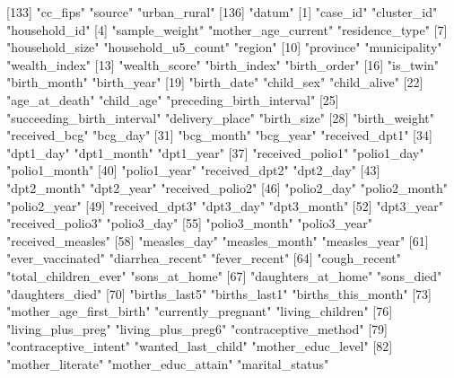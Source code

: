 [133] "cc_fips"                   "source"                    "urban_rural"              
[136] "datum"                    
  [1] "case_id"                   "cluster_id"                "household_id"             
  [4] "sample_weight"             "mother_age_current"        "residence_type"           
  [7] "household_size"            "household_u5_count"        "region"                   
 [10] "province"                  "municipality"              "wealth_index"             
 [13] "wealth_score"              "birth_index"               "birth_order"              
 [16] "is_twin"                   "birth_month"               "birth_year"               
 [19] "birth_date"                "child_sex"                 "child_alive"              
 [22] "age_at_death"              "child_age"                 "preceding_birth_interval" 
 [25] "succeeding_birth_interval" "delivery_place"            "birth_size"               
 [28] "birth_weight"              "received_bcg"              "bcg_day"                  
 [31] "bcg_month"                 "bcg_year"                  "received_dpt1"            
 [34] "dpt1_day"                  "dpt1_month"                "dpt1_year"                
 [37] "received_polio1"           "polio1_day"                "polio1_month"             
 [40] "polio1_year"               "received_dpt2"             "dpt2_day"                 
 [43] "dpt2_month"                "dpt2_year"                 "received_polio2"          
 [46] "polio2_day"                "polio2_month"              "polio2_year"              
 [49] "received_dpt3"             "dpt3_day"                  "dpt3_month"               
 [52] "dpt3_year"                 "received_polio3"           "polio3_day"               
 [55] "polio3_month"              "polio3_year"               "received_measles"         
 [58] "measles_day"               "measles_month"             "measles_year"             
 [61] "ever_vaccinated"           "diarrhea_recent"           "fever_recent"             
 [64] "cough_recent"              "total_children_ever"       "sons_at_home"             
 [67] "daughters_at_home"         "sons_died"                 "daughters_died"           
 [70] "births_last5"              "births_last1"              "births_this_month"        
 [73] "mother_age_first_birth"    "currently_pregnant"        "living_children"          
 [76] "living_plus_preg"          "living_plus_preg6"         "contraceptive_method"     
 [79] "contraceptive_intent"      "wanted_last_child"         "mother_educ_level"        
 [82] "mother_literate"           "mother_educ_attain"        "marital_status"           

